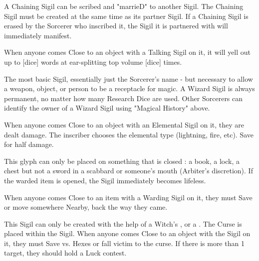 {  A Chaining Sigil can be scribed and "marrieD" to another Sigil.  The Chaining Sigil must be created at the same time as its partner Sigil.  If a Chaining Sigil is erased by the Sorcerer who inscribed it, the Sigil it is partnered with will immediately manifest.

 When anyone comes Close to an object with a Talking Sigil on it, it will yell out up to [dice] words at ear-splitting top volume [dice] times.



The most basic Sigil, essentially just the Sorcerer's name - but necessary to allow a weapon, object, or person to be a receptacle for magic.  A Wizard Sigil is always permanent, no matter how many Research Dice are used.  Other Sorcerers can identify the owner of a Wizard Sigil using "Magical History" above.





When anyone comes Close to an object with an Elemental Sigil on it, they are dealt \SUMDICE damage.  The inscriber chooses the elemental type (lightning, fire, etc).  Save for half damage.


This glyph can only be placed on something that is closed : a book, a lock, a chest but not a sword in a scabbard or someone's mouth (Arbiter's discretion).  If the warded item is opened, the Sigil immediately becomes lifeless.

When anyone comes Close to an item with a Warding Sigil on it, they must Save or move somewhere Nearby, back the way they came. 






This Sigil can only be created with the help of a Witch's , or a .  The Curse is placed within the Sigil.  When anyone comes Close to an object with the Sigil on it, they must Save vs. Hexes or fall victim to the curse.  If there is more than 1 target, they should hold a Luck contest. 

}
